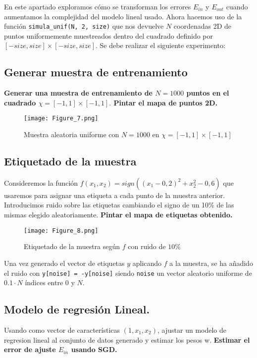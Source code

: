 En este apartado exploramos cómo se transforman los errores $E_{in}$ y $E_{out}$
cuando aumentamos la complejidad del modelo lineal usado. Ahora hacemos uso de
la función \texttt{simula_unif(N, 2, size)} que nos devuelve $N$
coordenadas 2D de puntos uniformemente muestreados dentro del cuadrado definido
por  $[-size,size] \times [-size, size]$. Se debe realizar el siguiente experimento:

\subsection{Generar muestra de entrenamiento}

\textbf{Generar una muestra de entrenamiento de $N = 1000$ puntos en el cuadrado
$\chi = [-1, 1] \times [-1, 1].$ Pintar el mapa de puntos 2D.}

\begin{figure}[H]
\centering
\texttt{[image: Figure\_7.png]}
\caption{Muestra aleatoria uniforme con $N = 1000$ en $\chi=[-1, 1] \times [-1, 1]$}
\end{figure}


\subsection{Etiquetado de la muestra}

Consideremos la función $f(x_1, x_2) = sign\left( (x_1 - 0,2)^2 + x_2^2 - 0,6 \right)$ 
que usaremos para asignar una etiqueta a cada punto de la muestra anterior.
Introducimos ruido sobre las etiquetas cambiando el signo de un 10\%
de las mismas elegido aleatoriamente. \textbf{Pintar el mapa de etiquetas obtenido.}

\begin{figure}[H]
\centering
\texttt{[image: Figure\_8.png]}
\caption{Etiquetado de la muestra según $f$ con ruido de $10\%$}
\end{figure}

Una vez generado el vector de etiquetas $y$ aplicando $f$ a la muestra, se ha añadido 
el ruido con \texttt{y[noise] = -y[noise]} siendo \texttt{noise}
un vector aleatorio uniforme de $0.1 \cdot N$ índices entre $0$ y $N$. 


\subsection{Modelo de regresión Lineal.}

Usando como vector de características $(1, x_1, x_2)$, ajustar un modelo de
regresion lineal al conjunto de datos generado y estimar los pesos w. 
\textbf{Estimar el error de ajuste $E_{in}$ usando SGD.}

